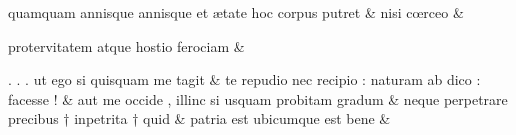 \documentclass[12pt,onecolumn,twoside,a4paper]{memoir}
\begin{document}
\begin{pairs}
\begin{Leftside}
                              quamquam
                              annisque
                              {annisque}
                              et
                              ætate
                              hoc
                              corpus
                              putret \&
                         \stanza {}nisi
                              cœrceo & 
                     
                              protervitatem
                              atque
                              hostio
                              ferociam \&
                         \stanza {}
                     
                              .
                              .
                              .
                              ut
                              ego
                              si
                              quisquam
                              me
                              tagit \&
                         \stanza {}
                     te
                              repudio
                              nec
                              recipio
                              :
                              naturam
                              ab
                              dico
                              :
                              facesse
                              ! \&
                         \stanza {}
                     aut
                              me
                              occide
                              ,
                              illinc
                              si
                              usquam
                              probitam
                              gradum \&
                         \stanza {}
                     neque
                              perpetrare
                              precibus
                              †
                              inpetrita
                              †
                              quid \&
                         \stanza {}
                     patria
                              est
                              ubicumque
                              est
                              bene \&
                     

\end{Leftside}
\end{pairs}
\end{document}
